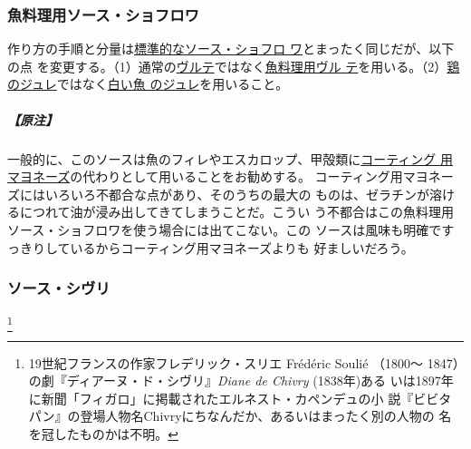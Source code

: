 \begin{recette}
\maeaki

\hypertarget{sauce-chaud-froid-maigre}{%
\subsubsection{魚料理用ソース・ショフロワ}\label{sauce-chaud-froid-maigre}}



作り方の手順と分量は\protect\hyperlink{sauce-chaud-froid-blanche-ordinaire}{標準的なソース・ショフロ
ワ}とまったく同じだが、以下の点
を変更する。（1）通常の\protect\hyperlink{veloute}{ヴルテ}ではなく\protect\hyperlink{veloute-de-poisson}{魚料理用ヴル
テ}を用いる。（2）\protect\hyperlink{}{鶏のジュレ}ではなく\protect\hyperlink{}{白い魚
のジュレ}を用いること。

\hypertarget{ux539fux6ce8-2}{%
\subparagraph{【原注】}\label{ux539fux6ce8-2}}

一般的に、このソースは魚のフィレやエスカロップ、甲殻類に\protect\hyperlink{mayonnaise-collee}{コーティング
用マヨネーズ}の代わりとして用いることをお勧めする。
コーティング用マヨネーズにはいろいろ不都合な点があり、そのうちの最大の
ものは、ゼラチンが溶けるにつれて油が浸み出してきてしまうことだ。こうい
う不都合はこの魚料理用ソース・ショフロワを使う場合には出てこない。この
ソースは風味も明確ですっきりしているからコーティング用マヨネーズよりも
好ましいだろう。

\maeaki

\hypertarget{sacue-chivry}{%
\subsubsection{ソース・シヴリ}\label{sacue-chivry}}

\footnote{19世紀フランスの作家フレデリック・スリエ
  Frédéric Soulié （1800〜
  1847）の劇『ディアーヌ・ド・シヴリ』\emph{Diane de Chivry}
  (1838年)ある
  いは1897年に新聞「フィガロ」に掲載されたエルネスト・カペンデュの小
  説『ビビタパン』の登場人物名Chivryにちなんだか、あるいはまったく別の人物の
  名を冠したものかは不明。}


\end{recette}
